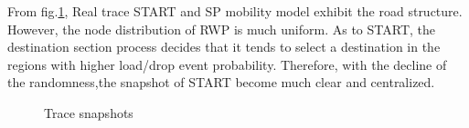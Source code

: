 From fig.\ref{figure_trace_snapshots}, Real trace START and SP mobility model exhibit the road structure. However, the node distribution of RWP is much uniform.
As to START, the destination section process decides that it tends to select a destination in the regions with higher load/drop event probability.
Therefore, with the decline of the randomness,the snapshot of START become much clear and centralized.
\begin{figure}[!h]
\centering
{}
\vspace{0.in}
\hspace{0.0in}
\vspace{0.in}
\hspace{0.0in}
\vspace{0.in}
\hspace{0.0in}
\caption{Trace snapshots}\label{figure_trace_snapshots}
\end{figure}



